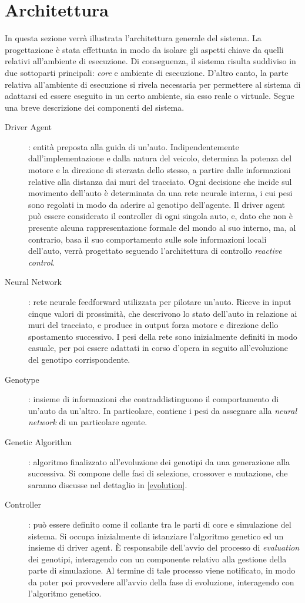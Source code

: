 \documentclass[a4paper,12pt]{article}
\begin{document}
\section{Architettura} \label{architecture}
In questa sezione verrà illustrata l'architettura generale del sistema. La progettazione è stata effettuata in modo da isolare gli aspetti chiave da quelli relativi all'ambiente di esecuzione. Di conseguenza, il sistema risulta suddiviso in due sottoparti principali: \emph{core} e ambiente di esecuzione. D'altro canto, la parte relativa all'ambiente di esecuzione si rivela necessaria per permettere al sistema di adattarsi ed essere eseguito in un certo ambiente, sia esso reale o virtuale. Segue una breve descrizione dei componenti del sistema.
\begin{description}
	\item[Driver Agent]: entità preposta alla guida di un'auto. Indipendentemente dall'implementazione e dalla natura del veicolo, determina la potenza del motore e la direzione di sterzata dello stesso, a partire dalle informazioni relative alla distanza dai muri del tracciato. Ogni decisione che incide sul movimento dell'auto è determinata da una rete neurale interna, i cui pesi sono regolati in modo da aderire al genotipo dell'agente. Il driver agent può essere considerato il controller di ogni singola auto, e, dato che non è presente alcuna rappresentazione formale del mondo al suo interno, ma, al contrario, basa il suo comportamento sulle sole informazioni locali dell'auto, verrà progettato seguendo l'architettura di controllo \emph{reactive control}. 
	\item[Neural Network]: rete neurale feedforward utilizzata per pilotare un'auto. Riceve in input cinque valori di prossimità, che descrivono lo stato dell'auto in relazione ai muri del tracciato, e produce in output forza motore e direzione dello spostamento successivo. I pesi della rete sono inizialmente definiti in modo casuale, per poi essere adattati in corso d'opera in seguito all'evoluzione del genotipo corrispondente.
	\item[Genotype]: insieme di informazioni che contraddistinguono il comportamento di un'auto da un'altro. In particolare, contiene i pesi da assegnare alla \emph{neural network} di un particolare agente.
	\item[Genetic Algorithm]: algoritmo finalizzato all'evoluzione dei genotipi da una generazione alla successiva. Si compone delle fasi di selezione, crossover e mutazione, che saranno discusse nel dettaglio in \autoref{evolution}.
	\item[Controller]: può essere definito come il collante tra le parti di core e simulazione del sistema. Si occupa inizialmente di istanziare l'algoritmo genetico ed un insieme di driver agent. È responsabile dell'avvio del processo di \emph{evaluation} dei genotipi, interagendo con un componente relativo alla gestione della parte di simulazione. Al termine di tale processo viene notificato, in modo da poter poi provvedere all'avvio della fase di evoluzione, interagendo con l'algoritmo genetico.
\end{description}
\end{document}
